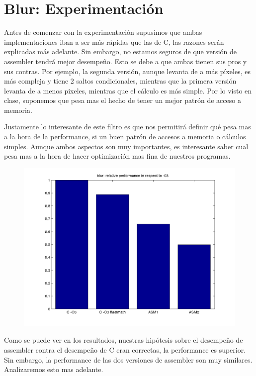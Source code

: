 \section*{Blur: Experimentación}

Antes de comenzar con la experimentación supusimos que ambas implementaciones iban a ser más rápidas que las de C, las razones serán explicadas más adelante. Sin embargo, no estamos seguros de que versión de assembler tendrá mejor desempeño.
Esto se debe a que ambas tienen sus pros y sus contras. Por ejemplo, la segunda versión, aunque levanta de a más píxeles, es más compleja y tiene 2 saltos condicionales, mientras que la primera versión levanta de a menos pixeles, mientras que el cálculo es más simple. Por lo visto en clase, suponemos que pesa mas el hecho de tener un mejor patrón de acceso a memoria.

Justamente lo interesante de este filtro es que nos permitirá definir qué pesa mas a la hora de la performance, si un buen patrón de accesos a memoria o cálculos simples. Aunque ambos aspectos son muy importantes, es interesante saber cual pesa mas a la hora de hacer optimización mas fina de nuestros programas.

\begin{figure}[!hbt] 
  \includegraphics[width=15cm]{blur-random-uniform-pixel-fixed-size_barchart.png}
	\centering
\end{figure}


Como se puede ver en los resultados, nuestras hipótesis sobre el desempeño de assembler contra el desempeño de C eran correctas, la performance es superior. Sin embargo, la performance de las dos versiones de assembler son muy similares. Analizaremos esto mas adelante.


